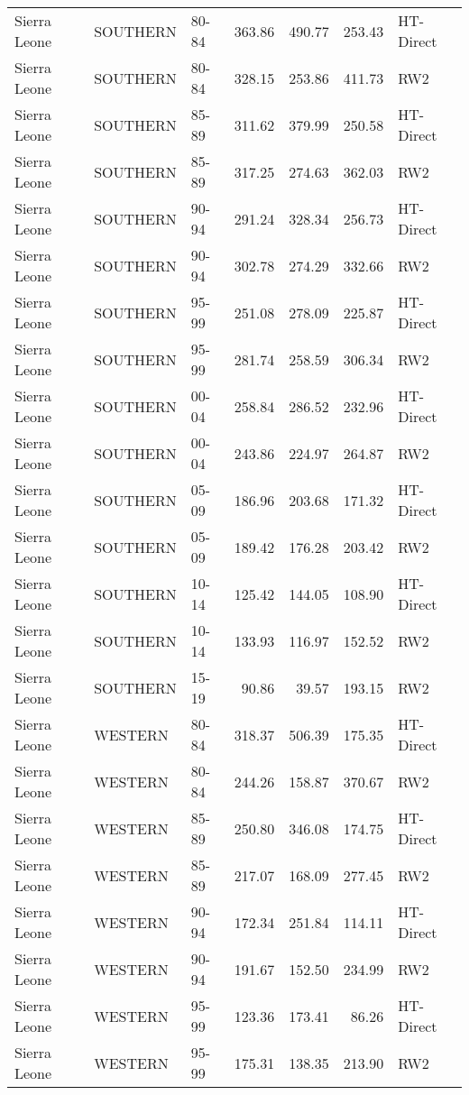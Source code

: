 \begin{longtable}{lllrrrl}
  Sierra Leone & SOUTHERN & 80-84 & 363.86 & 490.77 & 253.43 & HT-Direct \\ 
  Sierra Leone & SOUTHERN & 80-84 & 328.15 & 253.86 & 411.73 & RW2 \\ 
  Sierra Leone & SOUTHERN & 85-89 & 311.62 & 379.99 & 250.58 & HT-Direct \\ 
  Sierra Leone & SOUTHERN & 85-89 & 317.25 & 274.63 & 362.03 & RW2 \\ 
  Sierra Leone & SOUTHERN & 90-94 & 291.24 & 328.34 & 256.73 & HT-Direct \\ 
  Sierra Leone & SOUTHERN & 90-94 & 302.78 & 274.29 & 332.66 & RW2 \\ 
  Sierra Leone & SOUTHERN & 95-99 & 251.08 & 278.09 & 225.87 & HT-Direct \\ 
  Sierra Leone & SOUTHERN & 95-99 & 281.74 & 258.59 & 306.34 & RW2 \\ 
  Sierra Leone & SOUTHERN & 00-04 & 258.84 & 286.52 & 232.96 & HT-Direct \\ 
  Sierra Leone & SOUTHERN & 00-04 & 243.86 & 224.97 & 264.87 & RW2 \\ 
  Sierra Leone & SOUTHERN & 05-09 & 186.96 & 203.68 & 171.32 & HT-Direct \\ 
  Sierra Leone & SOUTHERN & 05-09 & 189.42 & 176.28 & 203.42 & RW2 \\ 
  Sierra Leone & SOUTHERN & 10-14 & 125.42 & 144.05 & 108.90 & HT-Direct \\ 
  Sierra Leone & SOUTHERN & 10-14 & 133.93 & 116.97 & 152.52 & RW2 \\ 
  Sierra Leone & SOUTHERN & 15-19 & 90.86 & 39.57 & 193.15 & RW2 \\ 
  Sierra Leone & WESTERN & 80-84 & 318.37 & 506.39 & 175.35 & HT-Direct \\ 
  Sierra Leone & WESTERN & 80-84 & 244.26 & 158.87 & 370.67 & RW2 \\ 
  Sierra Leone & WESTERN & 85-89 & 250.80 & 346.08 & 174.75 & HT-Direct \\ 
  Sierra Leone & WESTERN & 85-89 & 217.07 & 168.09 & 277.45 & RW2 \\ 
  Sierra Leone & WESTERN & 90-94 & 172.34 & 251.84 & 114.11 & HT-Direct \\ 
  Sierra Leone & WESTERN & 90-94 & 191.67 & 152.50 & 234.99 & RW2 \\ 
  Sierra Leone & WESTERN & 95-99 & 123.36 & 173.41 & 86.26 & HT-Direct \\ 
  Sierra Leone & WESTERN & 95-99 & 175.31 & 138.35 & 213.90 & RW2 \\ 

\end{longtable}
